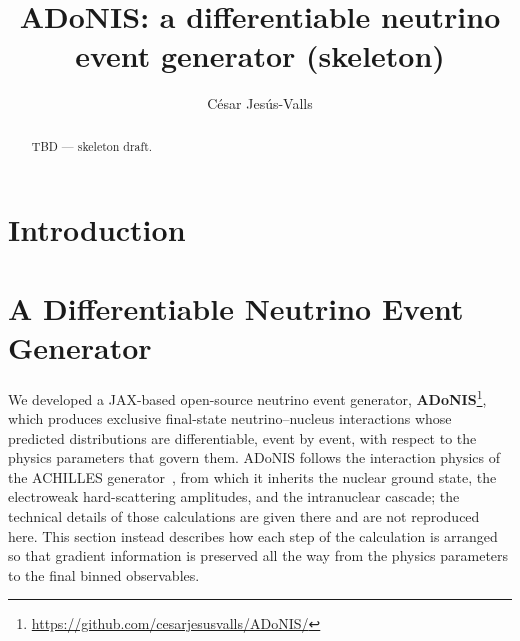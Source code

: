 \documentclass[aps,prd,reprint,superscriptaddress,nofootinbib,amsmath,amssymb,floatfix]{revtex4-1}
\newcommand{\adonis}{{ADoNIS}\xspace}
\begin{document}
\title{ADoNIS: a differentiable neutrino event generator (skeleton)}
\author{C\'esar Jes\'us-Valls}

\begin{abstract}
\noindent TBD --- skeleton draft.
\end{abstract}

\maketitle

\tableofcontents

\section{Introduction}

\section{A Differentiable Neutrino Event Generator}
\label{sec:adonis}

We developed a JAX-based open-source neutrino event
generator, \textbf{\adonis}\footnote{\href{https://github.com/cesarjesusvalls/ADoNIS/}{https://github.com/cesarjesusvalls/ADoNIS/}},
which produces exclusive final-state neutrino--nucleus interactions whose
predicted distributions are differentiable, event by event, with respect to the
physics parameters that govern them. \adonis follows the interaction physics of
the ACHILLES generator~\cite{Isaacson:2020wlx, Isaacson:2022cwh}, from which it
inherits the nuclear ground state, the electroweak hard-scattering amplitudes,
and the intranuclear cascade; the technical details of those calculations are
given there and are not reproduced here. This section instead describes how each
step of the calculation is arranged so that gradient information is preserved all
the way from the physics parameters to the final binned observables.
\end{document}

